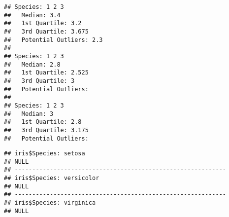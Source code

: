 \documentclass[
]{article}
\newenvironment{Shaded}{\begin{snugshade}}{\end{snugshade}}
\newcommand{\CommentTok}[1]{\textcolor[rgb]{0.56,0.35,0.01}{\textit{#1}}}
\newcommand{\ControlFlowTok}[1]{\textcolor[rgb]{0.13,0.29,0.53}{\textbf{#1}}}
\newcommand{\FloatTok}[1]{\textcolor[rgb]{0.00,0.00,0.81}{#1}}
\newcommand{\FunctionTok}[1]{\textcolor[rgb]{0.13,0.29,0.53}{\textbf{#1}}}
\newcommand{\NormalTok}[1]{#1}
\newcommand{\SpecialCharTok}[1]{\textcolor[rgb]{0.81,0.36,0.00}{\textbf{#1}}}
\newcommand{\StringTok}[1]{\textcolor[rgb]{0.31,0.60,0.02}{#1}}
\begin{document}
\begin{Shaded}
\end{Shaded}

\begin{verbatim}
## Species: 1 2 3 
##   Median: 3.4 
##   1st Quartile: 3.2 
##   3rd Quartile: 3.675 
##   Potential Outliers: 2.3 
## 
## Species: 1 2 3 
##   Median: 2.8 
##   1st Quartile: 2.525 
##   3rd Quartile: 3 
##   Potential Outliers:  
## 
## Species: 1 2 3 
##   Median: 3 
##   1st Quartile: 2.8 
##   3rd Quartile: 3.175 
##   Potential Outliers:
\end{verbatim}

\begin{verbatim}
## iris$Species: setosa
## NULL
## ------------------------------------------------------------ 
## iris$Species: versicolor
## NULL
## ------------------------------------------------------------ 
## iris$Species: virginica
## NULL
\end{verbatim}
\end{document}
